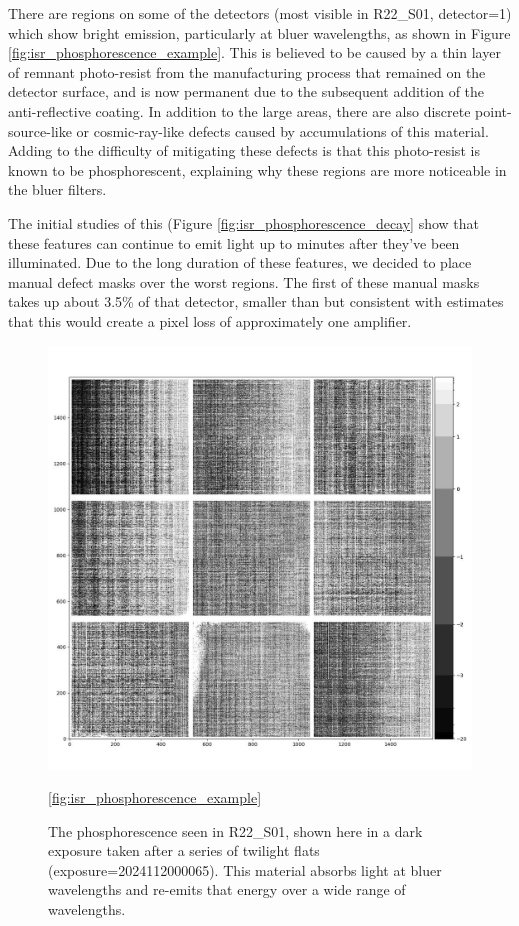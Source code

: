 There are regions on some of the detectors (most visible in R22_S01, detector=1) which show bright emission, particularly at bluer wavelengths, as shown in Figure \ref{fig:isr_phosphorescence_example}.
This is believed to be caused by a thin layer of remnant photo-resist from the manufacturing process that remained on the detector surface, and is now permanent due to the subsequent addition of the anti-reflective coating.
In addition to the large areas, there are also discrete point-source-like or cosmic-ray-like defects caused by accumulations of this material.
Adding to the difficulty of mitigating these defects is that this photo-resist is known to be phosphorescent, explaining why these regions are more noticeable in the bluer filters.

The initial studies of this (Figure \ref{fig:isr_phosphorescence_decay} show that these features can continue to emit light up to minutes after they've been illuminated.
Due to the long duration of these features, we decided to place manual defect masks over the worst regions.
The first of these manual masks takes up about 3.5\% of that detector, smaller than but consistent with estimates that this would create a pixel loss of approximately one amplifier.

\begin{figure}
  \includegraphics{figures/isr-f01-phosphor_dark_exposure.jpg}
  \caption{The phosphorescence seen in R22_S01, shown here in a dark exposure taken after a series of twilight flats (exposure=2024112000065).  This material absorbs light at bluer wavelengths and re-emits that energy over a wide range of wavelengths.}
  \ref{fig:isr_phosphorescence_example}
\end{figure}

